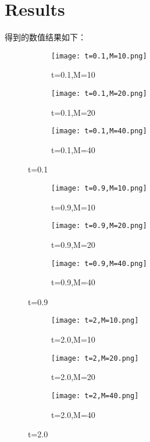 \documentclass{article}
\begin{document}
\section{Results}

得到的数值结果如下：
\begin{figure}[H]
    \centering
    \begin{subfigure}[b]{0.47\textwidth}
        \centering
        \texttt{[image: t=0.1,M=10.png]}
        \caption{t=0.1,M=10}
    \end{subfigure}
    \begin{subfigure}[b]{0.47\textwidth}
        \centering
        \texttt{[image: t=0.1,M=20.png]}
        \caption{t=0.1,M=20}
    \end{subfigure}
    \begin{subfigure}[b]{0.47\textwidth}
        \centering
        \texttt{[image: t=0.1,M=40.png]}
        \caption{t=0.1,M=40}
    \end{subfigure}
    \caption{t=0.1}
\end{figure}
\begin{figure}[H]
    \centering
    \begin{subfigure}[b]{0.47\textwidth}
        \centering
        \texttt{[image: t=0.9,M=10.png]}
        \caption{t=0.9,M=10}
    \end{subfigure}
    \begin{subfigure}[b]{0.47\textwidth}
        \centering
        \texttt{[image: t=0.9,M=20.png]}
        \caption{t=0.9,M=20}
    \end{subfigure}
    \begin{subfigure}[b]{0.47\textwidth}
        \centering
        \texttt{[image: t=0.9,M=40.png]}
        \caption{t=0.9,M=40}
    \end{subfigure}
    \caption{t=0.9}
\end{figure}
\begin{figure}[H]
    \centering
    \begin{subfigure}[b]{0.47\textwidth}
        \centering
        \texttt{[image: t=2,M=10.png]}
        \caption{t=2.0,M=10}
    \end{subfigure}
    \begin{subfigure}[b]{0.47\textwidth}
        \centering
        \texttt{[image: t=2,M=20.png]}
        \caption{t=2.0,M=20}
    \end{subfigure}
    \begin{subfigure}[b]{0.47\textwidth}
        \centering
        \texttt{[image: t=2,M=40.png]}
        \caption{t=2.0,M=40}
    \end{subfigure}
    \caption{t=2.0}
\end{figure}
\end{document}
